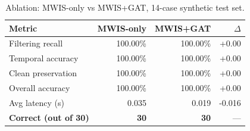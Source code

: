 \begin{table}[t]
\centering
\caption{Ablation: MWIS-only vs MWIS+GAT, 14-case synthetic test set.}
\label{tab:ablation}
\begin{tabular}{lrrr}
\toprule
Metric & MWIS-only & MWIS+GAT & $\Delta$ \\
\midrule
Filtering recall & 100.00\% & 100.00\% & +0.00 \\
Temporal accuracy & 100.00\% & 100.00\% & +0.00 \\
Clean preservation & 100.00\% & 100.00\% & +0.00 \\
Overall accuracy & 100.00\% & 100.00\% & +0.00 \\
Avg latency (s) & 0.035 & 0.019 & -0.016 \\
\midrule
\textbf{Correct (out of 30)} & \textbf{30} & \textbf{30} & — \\
\bottomrule
\end{tabular}
\end{table}
